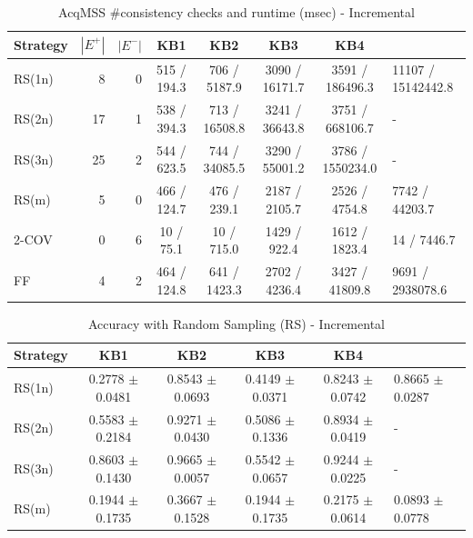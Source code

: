 \usepackage{booktabs}


\begin{table}[htbp]
\centering
\caption{AcqMSS \#consistency checks and runtime (msec) - Incremental}
\label{tab:table7_incremental}
\begin{tabular}{lrrcccc}
\toprule
Strategy & $|E^+|$ & $|E^-|$ & KB1 & KB2 & KB3 & KB4 \\
\midrule
RS(1n) & 8 & 0 & 515 / 194.3 & 706 / 5187.9 & 3090 / 16171.7 & 3591 / 186496.3 & 11107 / 15142442.8 \\
RS(2n) & 17 & 1 & 538 / 394.3 & 713 / 16508.8 & 3241 / 36643.8 & 3751 / 668106.7 & - \\
RS(3n) & 25 & 2 & 544 / 623.5 & 744 / 34085.5 & 3290 / 55001.2 & 3786 / 1550234.0 & - \\
RS(m) & 5 & 0 & 466 / 124.7 & 476 / 239.1 & 2187 / 2105.7 & 2526 / 4754.8 & 7742 / 44203.7 \\
2-COV & 0 & 6 & 10 / 75.1 & 10 / 715.0 & 1429 / 922.4 & 1612 / 1823.4 & 14 / 7446.7 \\
FF & 4 & 2 & 464 / 124.8 & 641 / 1423.3 & 2702 / 4236.4 & 3427 / 41809.8 & 9691 / 2938078.6 \\
\bottomrule
\end{tabular}
\end{table}

\begin{table}[htbp]
\centering
\caption{Accuracy with Random Sampling (RS) - Incremental}
\label{tab:table9_incremental}
\begin{tabular}{lcccc}
\toprule
Strategy & KB1 & KB2 & KB3 & KB4 \\
\midrule
RS(1n) & 0.2778 $\pm$ 0.0481 & 0.8543 $\pm$ 0.0693 & 0.4149 $\pm$ 0.0371 & 0.8243 $\pm$ 0.0742 & 0.8665 $\pm$ 0.0287 \\
RS(2n) & 0.5583 $\pm$ 0.2184 & 0.9271 $\pm$ 0.0430 & 0.5086 $\pm$ 0.1336 & 0.8934 $\pm$ 0.0419 & - \\
RS(3n) & 0.8603 $\pm$ 0.1430 & 0.9665 $\pm$ 0.0057 & 0.5542 $\pm$ 0.0657 & 0.9244 $\pm$ 0.0225 & - \\
RS(m) & 0.1944 $\pm$ 0.1735 & 0.3667 $\pm$ 0.1528 & 0.1944 $\pm$ 0.1735 & 0.2175 $\pm$ 0.0614 & 0.0893 $\pm$ 0.0778 \\
\bottomrule
\end{tabular}
\end{table}

